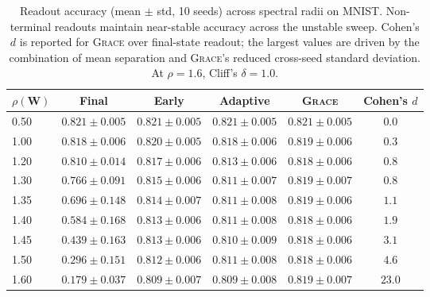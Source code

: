 \documentclass{article}
\theoremstyle{remark}
\newcommand{\bW}{\mathbf{W}}
\newcommand{\grace}{\textnormal{\textsc{Grace}}}
\newcommand{\sr}{\rho(\bW)}
\begin{document}
\begin{table}[t]
\centering
\caption{Readout accuracy (mean $\pm$ std, 10 seeds) across spectral radii
on MNIST. Non-terminal readouts maintain near-stable accuracy across the
unstable sweep. Cohen's $d$ is reported for \grace{} over final-state readout;
the largest values are driven by the combination of mean separation and
\grace{}'s reduced cross-seed standard deviation. At $\rho=1.6$, Cliff's
$\delta=1.0$.}
\label{tab:main}
\small
\begin{tabular}{l c c c c c}
\toprule
$\sr$ & Final & Early & Adaptive & \grace{} & Cohen's $d$\\
\midrule
0.50 & $0.821{\pm}0.005$ & $0.821{\pm}0.005$ & $0.821{\pm}0.005$ & $0.821{\pm}0.005$ & \phantom{0}$0.0$\\

1.00 & $0.818{\pm}0.006$ & $0.820{\pm}0.005$ & $0.818{\pm}0.006$ & $0.819{\pm}0.006$ & \phantom{0}$0.3$\\

1.20 & $0.810{\pm}0.014$ & $0.817{\pm}0.006$ & $0.813{\pm}0.006$ & $0.818{\pm}0.006$ & \phantom{0}$0.8$\\

1.30 & $0.766{\pm}0.091$ & $0.815{\pm}0.006$ & $0.811{\pm}0.007$ & $0.819{\pm}0.007$ & \phantom{0}$0.8$\\

1.35 & $0.696{\pm}0.148$ & $0.814{\pm}0.007$ & $0.811{\pm}0.008$ & $0.819{\pm}0.006$ & \phantom{0}$1.1$\\

1.40 & $0.584{\pm}0.168$ & $0.813{\pm}0.006$ & $0.811{\pm}0.008$ & $0.818{\pm}0.006$ & \phantom{0}$1.9$\\

1.45 & $0.439{\pm}0.163$ & $0.813{\pm}0.006$ & $0.810{\pm}0.009$ & $0.818{\pm}0.006$ & \phantom{0}$3.1$\\

1.50 & $0.296{\pm}0.151$ & $0.812{\pm}0.006$ & $0.811{\pm}0.008$ & $0.818{\pm}0.006$ & \phantom{0}$4.6$\\

1.60 & $0.179{\pm}0.037$ & $0.809{\pm}0.007$ & $0.809{\pm}0.008$ & $0.819{\pm}0.007$ & $23.0$\\

\bottomrule
\end{tabular}
\end{table}
\end{document}
